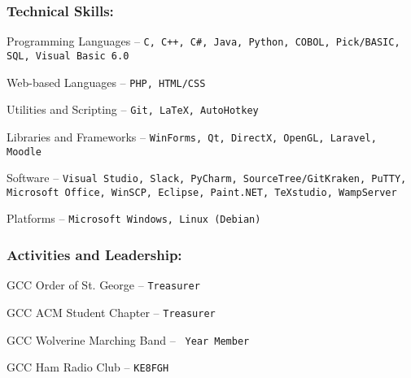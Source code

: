 \documentclass[12pt]{article}
\begin{document}
\subsubsection*{\color{head}Technical Skills:}
\begin{compactitem}
	\item {\color{accent} Programming Languages} -- \texttt{C, C++, C\#, Java, Python, COBOL, Pick/BASIC, SQL, Visual Basic 6.0}
	\item {\color{accent} Web-based Languages} -- \texttt{PHP, HTML/CSS}
	\item {\color{accent} Utilities and Scripting} -- \texttt{Git, LaTeX, AutoHotkey}
	\item {\color{accent} Libraries and Frameworks} -- \texttt{WinForms, Qt, DirectX, OpenGL, Laravel, Moodle}
	\item {\color{accent} Software} -- \texttt{Visual Studio, Slack, PyCharm, SourceTree/GitKraken, PuTTY, Microsoft Office, WinSCP, Eclipse, Paint.NET, TeXstudio, WampServer}
	\item {\color{accent} Platforms} -- \texttt{Microsoft Windows, Linux (Debian)}
\end{compactitem}

\subsubsection*{\color{head}Activities and Leadership:}
\begin{compactitem}
	\item {\color{accent} GCC Order of St. George} -- \texttt{Treasurer}
	\item {\color{accent} GCC ACM Student Chapter} -- \texttt{Treasurer}
	\item {\color{accent} GCC Wolverine Marching Band} -- \texttt{ Year Member}
	\item {\color{accent} GCC Ham Radio Club} -- \texttt{KE8FGH}
\end{compactitem}
\end{document}
